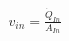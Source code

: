 \documentclass[preview]{standalone}
\begin{document}
\begin{align*}
v_{in} = \frac{\dot{Q}_{In}}{A_{In}}
\end{align*}
\end{document}
